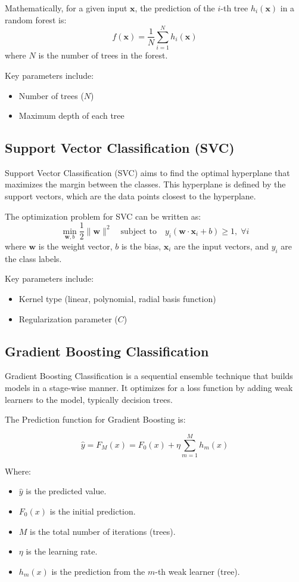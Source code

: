 Mathematically, for a given input $\mathbf{x}$, the prediction of the $i$-th tree $h_i(\mathbf{x})$ in a random forest is:
\[
f(\mathbf{x}) = \frac{1}{N} \sum_{i=1}^N h_i(\mathbf{x})
\]
where $N$ is the number of trees in the forest.

Key parameters include:
\begin{itemize}
    \item Number of trees ($N$)
    \item Maximum depth of each tree
\end{itemize}

\subsection{Support Vector Classification (SVC)}

Support Vector Classification (SVC) aims to find the optimal hyperplane that maximizes the margin between the classes. This hyperplane is defined by the support vectors, which are the data points closest to the hyperplane.

The optimization problem for SVC can be written as:
\[
\min_{\mathbf{w}, b} \frac{1}{2} \|\mathbf{w}\|^2 \quad \text{subject to} \quad y_i (\mathbf{w} \cdot \mathbf{x}_i + b) \geq 1, \; \forall i
\]
where $\mathbf{w}$ is the weight vector, $b$ is the bias, $\mathbf{x}_i$ are the input vectors, and $y_i$ are the class labels.

Key parameters include:
\begin{itemize}
    \item Kernel type (linear, polynomial, radial basis function)
    \item Regularization parameter ($C$)
\end{itemize}

\subsection{Gradient Boosting Classification}

Gradient Boosting Classification is a sequential ensemble technique that builds models in a stage-wise manner. It optimizes for a loss function by adding weak learners to the model, typically decision trees.

The Prediction function for Gradient Boosting is:

\[ \hat{y} = F_M(x) = F_0(x) + \eta \sum_{m=1}^M h_m(x) \]

Where:
\begin{itemize}
\item \( \hat{y} \) is the predicted value.
\item \( F_0(x) \) is the initial prediction.
\item \( M \) is the total number of iterations (trees).
\item \( \eta \) is the learning rate.
\item  \( h_m(x) \) is the prediction from the \( m \)-th weak learner (tree).
\end{itemize}

